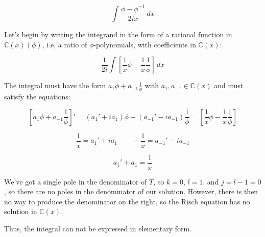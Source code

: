 $$\int \frac{\phi - \phi^{-1}}{2ix} \,dx$$

Let's begin by writing the integrand in the form of a rational
function in ${\mathbb C}(x)(\phi)$, i.e, a ratio
of $\phi$-polynomials, with coefficients in ${\mathbb C}(x)$:

$$\frac{1}{2i} \int \left[ \frac{1}{x}\phi - \frac{1}{x}\frac{1}{\phi} \right]\,dx$$

\begin{comment}
We want to split the denominator into its normal and special
components, by factoring it into irreducible polynomials and
classifying each one as normal or special.  In this case, the
factoriziation is trivial, and we know from theorem \ref{basic
exponential properties} that $\phi$ is special.

Can we have any logarithms in our integral?  Let's see.
Any logarithm of a rational function can be factored and
split into separate logarithms using basic properties
of a logarithms:

$$\ln ab = \ln a + \ln b \qquad\qquad \ln\frac{a}{b} = \ln a - \ln b$$

So, we need only consider logarithms of irreducible polynomials.

Theorem \ref{basic exponential properties} also tells us that we can
have no normal polynomials in denominator of our integral,
\end{comment}


The integral must have the form $a_1 \phi + a_{-1} \frac{1}{\phi}$
with $a_1, a_{-1} \in {\mathbb C}(x)$ and must satisfy the equations:

$$\left[ a_1 \phi + a_{-1}\frac{1}{\phi} \right]' = (a_1' + i a_1 ) \phi + (a_{-1}' - i a_{-1} ) \frac{1}{\phi}
= \left[ \frac{1}{x}\phi - \frac{1}{x}\frac{1}{\phi} \right]$$

$$\frac{1}{x} = a_1' + i a_1 \qquad - \frac{1}{x} = a_{-1}' - i a_{-1}$$

$$a_1' + a_1 = \frac{1}{x}$$

We've got a single pole in the denominator of $T$, so $k=0$, $l=1$,
and $j=l-1=0$, so there are no poles in the denominator of our solution.
However, there is then no way to produce the denominator on the
right, so the Risch equation has no solution in ${\mathbb C}(x)$.


Thus, the integral can not be expressed in elementary form.

\endexample

\vfil\eject

